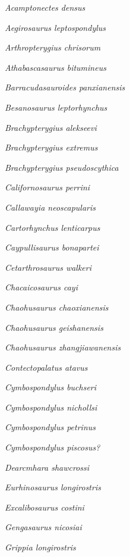 \emph{Acamptonectes densus} \cite{Fischer2012PO}

\emph{Aegirosaurus leptospondylus} \cite{Wagner1853BKAWGA}

\emph{Arthropterygius chrisorum} \cite{Russell1993BGSC}

\emph{Athabascasaurus bitumineus} \cite{Druckenmiller2010CJES}

\emph{Barracudasauroides panxianensis} \cite{Jiang2006JVP}

\emph{Besanosaurus leptorhynchus} \cite{DalSasso1996PL}

\emph{Brachypterygius alekseevi} \cite{Arkhangelsky2001PJ}

\emph{Brachypterygius extremus} \cite{Boulenger1904PZSL}

\emph{Brachypterygius pseudoscythica} \cite{Efimov1998PZ}

\emph{Californosaurus perrini} \cite{Merriam1902UCBDG}

\emph{Callawayia neoscapularis} \cite{McGowan1994JVPa}

\emph{Cartorhynchus lenticarpus} \cite{Motani2015N}

\emph{Caypullisaurus bonapartei} \cite{Fernandez1997JP}

\emph{Cetarthrosaurus walkeri} \cite{Seeley1873QJGS}

\emph{Chacaicosaurus cayi} \cite{Fernandez1994A}

\emph{Chaohusaurus chaoxianensis} \cite{Chen1985RGC}

\emph{Chaohusaurus geishanensis} \cite{Young1972MNIGP}

\emph{Chaohusaurus zhangjiawanensis} \cite{Chen2013AGS}

\emph{Contectopalatus atavus} \cite{Quenstedt1852}

\emph{Cymbospondylus buchseri} \cite{Sander1989JVP}

\emph{Cymbospondylus nichollsi} \cite{Frobisch2006ZJLS}

\emph{Cymbospondylus petrinus} \cite{Leidy1868PANSP}

\emph{Cymbospondylus piscosus?} \cite{Leidy1868PANSP}

\emph{Dearcmhara shawcrossi} \cite{Brusatte2015SJGa}

\emph{Eurhinosaurus longirostris} \cite{Mantell1851}

\emph{Excalibosaurus costini} \cite{McGowan1986N}

\emph{Gengasaurus nicosiai} \cite{Paparella2016GM}

\emph{Grippia longirostris} \cite{Wiman1929BGIU}

